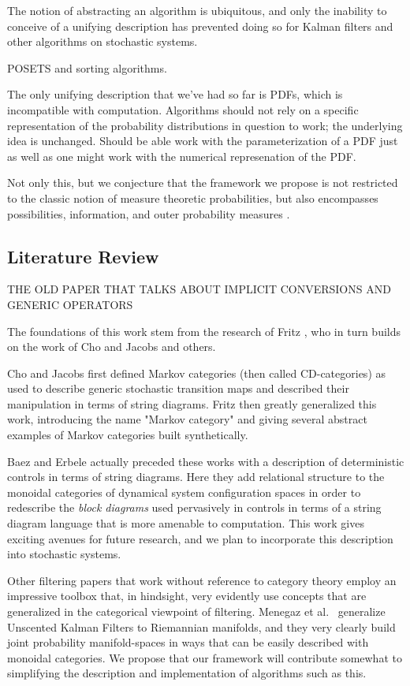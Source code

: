 \documentclass[letterpaper, 10 pt, conference]{ieeeconf}  %
\begin{document}
The notion of abstracting an algorithm is ubiquitous, and only the inability to conceive of a unifying description has prevented doing so for Kalman filters and other algorithms on stochastic systems. 

POSETS and sorting algorithms.

The only unifying description that we've had so far is PDFs, which is incompatible with computation. Algorithms should not rely on a specific representation of the probability distributions in question to work; the underlying idea is unchanged. Should be able work with the parameterization of a PDF just as well as one might work with the numerical represenation of the PDF.

Not only this, but we conjecture that the framework we propose is not restricted to the classic notion of measure theoretic probabilities, but also encompasses possibilities, information, and outer probability measures \cite{delande}. 

\subsection{Literature Review}

THE OLD PAPER THAT TALKS ABOUT IMPLICIT CONVERSIONS AND GENERIC OPERATORS

The foundations of this work stem from the research of Fritz \cite{fritz}, who in turn builds on the work of Cho and Jacobs \cite{cho} and others.

Cho and Jacobs first defined Markov categories (then called CD-categories) as used to describe generic stochastic transition maps and described their manipulation in terms of string diagrams. Fritz then greatly generalized this work, introducing the name "Markov category" and giving several abstract examples of Markov categories built synthetically. 

Baez and Erbele \cite{baez} actually preceded these works with a description of deterministic controls in terms of string diagrams. Here they add relational structure to the monoidal categories of dynamical system configuration spaces in order to redescribe the \emph{block diagrams} used pervasively in controls in terms of a string diagram language that is more amenable to computation.
This work gives exciting avenues for future research, and we plan to incorporate this description into stochastic systems.

Other filtering papers that work without reference to category theory employ an impressive toolbox that, in hindsight, very evidently use concepts that are generalized in the categorical viewpoint of filtering.
Menegaz et al.\ \cite{menegaz} generalize Unscented Kalman Filters to Riemannian manifolds, and they very clearly build joint probability manifold-spaces in ways that can be easily described with monoidal categories.
We propose that our framework will contribute somewhat to simplifying the description and implementation of algorithms such as this.
\end{document}
